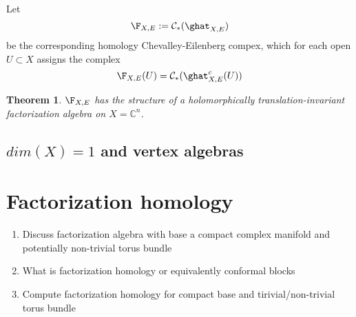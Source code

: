 \documentclass[12pt]{amsart}
\newtheorem{theorem}{Theorem}[section]
\theoremstyle{definition}
\theoremstyle{remark}
\def\brian{\textcolor{blue}{BW: }\textcolor{blue}}
\begin{document}
Let
\begin{equation}
\F_{X,E} := \mathcal{C}_{*} ( \ghat_{X,E} )
\end{equation}
be the corresponding homology Chevalley-Eilenberg compex, which for each open $U \subset X$ assigns the complex
\[
\F_{X,E}(U) = \mathcal{C}_{*} (\ghat^c_{X,E}(U))
\]

\begin{theorem}
$\F_{X,E}$ has the structure of a holomorphically translation-invariant factorization algebra on $X=\mathbb{C}^n$. 
\end{theorem}

\subsection{$dim(X)=1$ and vertex algebras}

\section{Factorization homology}

{\color{red}
\begin{enumerate}
\item Discuss factorization algebra with base a compact complex manifold and potentially non-trivial torus bundle
\item What is factorization homology or equivalently conformal blocks
\item Compute factorization homology for compact base and tirivial/non-trivial torus bundle
\end{enumerate}
}

\newpage


%  




\address{\tiny DEPARTMENT OF MATHEMATICS AND STATISTICS, BOSTON UNIVERSITY, 111 CUMMINGTON MALL, BOSTON} \\
\indent \footnotesize{}

\address{\tiny DEPARTMENT OF MATHEMATICS, NORTH\brian{WESTERN/EASTERN},...}
\indent \footnotesize{}
\end{document}

